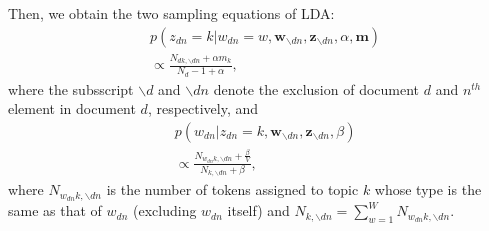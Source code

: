 \documentclass[twoside]{article}
\begin{document}
  	  Then, we obtain 
  	  \fi
  	  the two sampling equations of LDA:
  	  \begin{equation*}
  	  \begin{aligned}
  	  &p(z_{dn}=k | w_{dn}=w,\boldsymbol{w}_{\backslash dn}, \boldsymbol{z}_{\backslash dn},\alpha, \boldsymbol{m})\\&\propto
  	  \frac{N_{dk, \backslash dn}+\alpha m_k}{N_d-1+\alpha},
  	   \end{aligned}
  	   \end{equation*}
  	   where the subsscript $\backslash d$ and $\backslash dn$ denote the exclusion of document $d$ and $n^{th}$ element in document $d$, respectively, and
  	   \begin{equation*}
  	   \begin{aligned}  
  	   	  &p(w_{dn}| z_{dn}=k,\boldsymbol{w}_{\backslash dn}, \boldsymbol{z}_{\backslash dn},\beta)\\&\propto
  	   	  \frac{N_{w_{dn}k, \backslash dn}+\frac{\beta}{V}}{N_{k, \backslash dn}+\beta},
  	  \end{aligned}
  	  \end{equation*}
  	  where $N_{w_{dn}k, \backslash dn}$ is the number of tokens assigned to topic $k$ whose type is the same as that of $w_{dn}$ (excluding $w_{dn}$ itself) and $N_{k, \backslash dn}=\sum_{w=1}^W N_{w_{dn}k, \backslash dn}$. 
  	  
\end{document}
